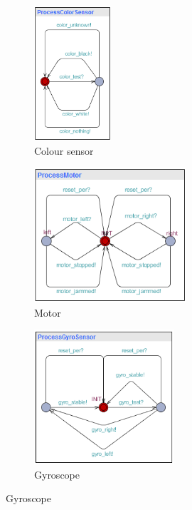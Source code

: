 \documentclass[a4paper,oneside,11pt]{article}
\begin{document}
\begin{figure}[H]
\centering
\begin{subfigure}{0.1\textwidth}
\centering
\includegraphics[height=50mm]{processcolorsensor}
\caption{Colour sensor}
\end{subfigure}
\hfill
\begin{subfigure}{0.3\textwidth}
\centering
\includegraphics[height=50mm]{processmotor}
\caption{Motor}
\end{subfigure}
\hfill
\begin{subfigure}{0.3\textwidth}
\centering
\includegraphics[height=50mm]{processgyrosensor}
\caption{Gyroscope}
\end{subfigure}


\end{figure}
\end{document}
